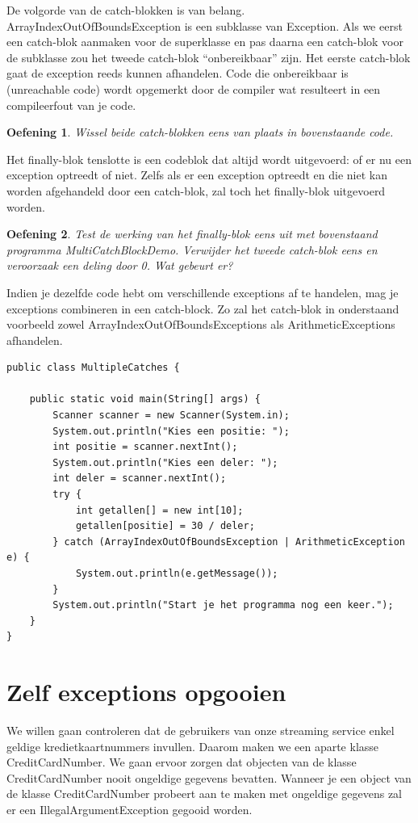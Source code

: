 \documentclass{tstextbook}
\newtheorem{envoefening}{Oefening}[chapter]
\newenvironment{oefening}
               {\begin{boxexercise}\begin{envoefening}}
               {\end{envoefening}\end{boxexercise}}
\begin{document}
De volgorde van de catch-blokken is van belang. ArrayIndexOutOfBoundsException is een subklasse van Exception. Als we eerst een catch-blok aanmaken voor de superklasse en pas daarna een catch-blok voor de subklasse zou het tweede catch-blok ``onbereikbaar'' zijn. Het eerste catch-blok gaat de exception reeds kunnen afhandelen. Code die onbereikbaar is (unreachable code) wordt opgemerkt door de compiler wat resulteert in een compileerfout van je code.

\begin{oefening}
Wissel beide catch-blokken eens van plaats in bovenstaande code.
\end{oefening}

Het finally-blok tenslotte is een codeblok dat altijd wordt uitgevoerd: of er nu een exception optreedt of niet. Zelfs als er een exception optreedt en die niet kan worden afgehandeld door een catch-blok, zal toch het finally-blok uitgevoerd worden.

\begin{oefening}
Test de werking van het finally-blok eens uit met bovenstaand programma MultiCatchBlockDemo. Verwijder het tweede catch-blok eens en veroorzaak een deling door 0. Wat gebeurt er?
\end{oefening}

Indien je dezelfde code hebt om verschillende exceptions af te handelen, mag je exceptions combineren in een catch-block. Zo zal het catch-blok in onderstaand voorbeeld zowel ArrayIndexOutOfBoundsExceptions als ArithmeticExceptions afhandelen.

\begin{lstlisting}
public class MultipleCatches {

	public static void main(String[] args) {
		Scanner scanner = new Scanner(System.in);
		System.out.println("Kies een positie: ");
		int positie = scanner.nextInt();
		System.out.println("Kies een deler: ");
		int deler = scanner.nextInt();
		try {
			int getallen[] = new int[10];
			getallen[positie] = 30 / deler;
		} catch (ArrayIndexOutOfBoundsException | ArithmeticException e) {
			System.out.println(e.getMessage());
		}
		System.out.println("Start je het programma nog een keer.");
	}
}
\end{lstlisting}

\section{Zelf exceptions opgooien}
We willen gaan controleren dat de gebruikers van onze streaming service enkel geldige kredietkaartnummers invullen. Daarom maken we een aparte klasse CreditCardNumber. We gaan ervoor zorgen dat objecten van de klasse CreditCardNumber nooit ongeldige gegevens bevatten. Wanneer je een object van de klasse CreditCardNumber probeert aan te maken met ongeldige gegevens zal er een IllegalArgumentException gegooid worden.
\end{document}
